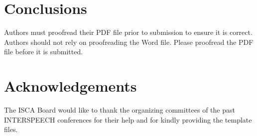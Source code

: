 \documentclass[a4paper]{article}
\begin{document}
  \section{Conclusions}

     Authors must proofread their PDF file prior to submission to ensure it is correct. 
     Authors should not rely on proofreading the Word file. 
     Please proofread the PDF file before it is submitted.


  \section{Acknowledgements}
  
    The ISCA Board would like to thank the organizing committees of the past INTERSPEECH conferences for their help and for kindly providing the template files.


  \newpage
  \eightpt
  

  

\end{document}
